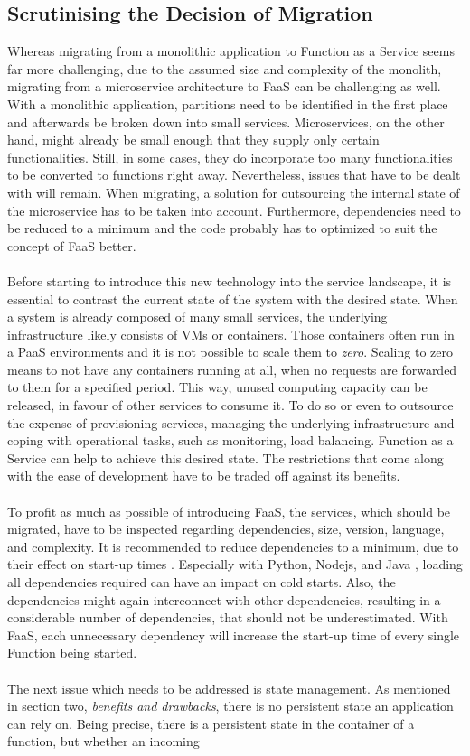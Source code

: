 \documentclass[a4paper,twoside,11pt, pagesize]{scrartcl}
\begin{document}
\subsection{Scrutinising the Decision of Migration}
Whereas migrating from a monolithic application to Function as a Service seems far more challenging, due to the assumed size and complexity of the monolith, migrating from a microservice architecture to FaaS can be challenging as well. With a monolithic application, partitions need to be identified in the first place and afterwards be broken down into small services. Microservices, on the other hand, might already be small enough that they supply only certain functionalities. Still, in some cases, they do incorporate too many functionalities to be converted to functions right away. Nevertheless, issues that have to be dealt with will remain. When migrating, a solution for outsourcing the internal state of the microservice has to be taken into account. Furthermore, dependencies need to be reduced to a minimum and the code probably has to optimized to suit the concept of FaaS better.\\\\ Before starting to introduce this new technology into the service landscape, it is essential to contrast the current state of the system with the desired state. When a system is already composed of many small services, the underlying infrastructure likely consists of VMs or containers. Those containers often run in a PaaS environments and it is not possible to scale them to \textit{zero}. Scaling to zero means to not have any containers running at all, when no requests are forwarded to them for a specified period. This way, unused computing capacity can be released, in favour of other services to consume it. To do so or even to outsource the expense of provisioning services, managing the underlying infrastructure and coping with operational tasks, such as monitoring, load balancing. Function as a Service can help to achieve this desired state. The restrictions that come along with the ease of development have to be traded off against its benefits.\\\\ To profit as much as possible of introducing FaaS, the services, which should be migrated, have to be inspected regarding dependencies, size, version, language, and complexity. It is recommended to reduce dependencies to a minimum, due to their effect on start-up times \cite{manner2018cold}. Especially with Python, Nodejs, and Java \cite{puripunpinyo2017effect}, loading all dependencies required can have an impact on cold starts. Also, the dependencies might again interconnect with other dependencies, resulting in a considerable number of dependencies, that should not be underestimated. With FaaS, each unnecessary dependency will increase the start-up time of every single Function being started.\\\\ The next issue which needs to be addressed is state management. As mentioned in section two, \textit{benefits and drawbacks}, there is no persistent state an application can rely on. Being precise, there is a persistent state in the container of a function, but whether an incoming 
\end{document}
